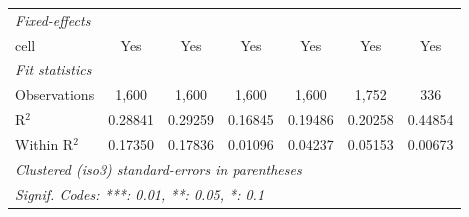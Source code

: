 \begin{tabular}{lcccccc}
   \midrule
   \emph{Fixed-effects}\\
   cell         & Yes             & Yes             & Yes      & Yes           & Yes            & Yes\\  
   \midrule
   \emph{Fit statistics}\\
   Observations & 1,600           & 1,600           & 1,600    & 1,600         & 1,752          & 336\\  
   R$^2$        & 0.28841         & 0.29259         & 0.16845  & 0.19486       & 0.20258        & 0.44854\\  
   Within R$^2$ & 0.17350         & 0.17836         & 0.01096  & 0.04237       & 0.05153        & 0.00673\\  
   \midrule \midrule
   \multicolumn{7}{l}{\emph{Clustered (iso3) standard-errors in parentheses}}\\
   \multicolumn{7}{l}{\emph{Signif. Codes: ***: 0.01, **: 0.05, *: 0.1}}\\
\end{tabular}
\par\endgroup


